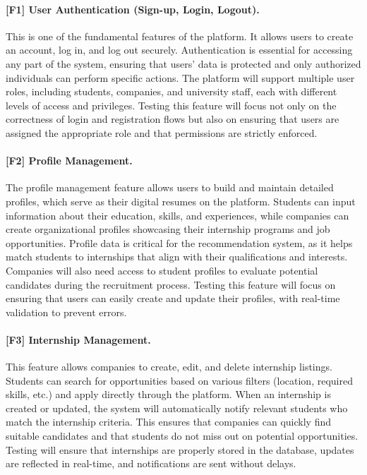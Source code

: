 \paragraph{[F1] User Authentication (Sign-up, Login, Logout).} This is one of the fundamental features of the platform. It allows users to create an account, log in, and log out securely. Authentication is essential for accessing any part of the system, ensuring that users' data is protected and only authorized individuals can perform specific actions. The platform will support multiple user roles, including students, companies, and university staff, each with different levels of access and privileges. Testing this feature will focus not only on the correctness of login and registration flows but also on ensuring that users are assigned the appropriate role and that permissions are strictly enforced.

\paragraph{[F2] Profile Management.} The profile management feature allows users to build and maintain detailed profiles, which serve as their digital resumes on the platform. Students can input information about their education, skills, and experiences, while companies can create organizational profiles showcasing their internship programs and job opportunities. Profile data is critical for the recommendation system, as it helps match students to internships that align with their qualifications and interests. Companies will also need access to student profiles to evaluate potential candidates during the recruitment process. Testing this feature will focus on ensuring that users can easily create and update their profiles, with real-time validation to prevent errors.

\paragraph{[F3] Internship Management.} This feature allows companies to create, edit, and delete internship listings. Students can search for opportunities based on various filters (location, required skills, etc.) and apply directly through the platform. When an internship is created or updated, the system will automatically notify relevant students who match the internship criteria. This ensures that companies can quickly find suitable candidates and that students do not miss out on potential opportunities. Testing will ensure that internships are properly stored in the database, updates are reflected in real-time, and notifications are sent without delays.

